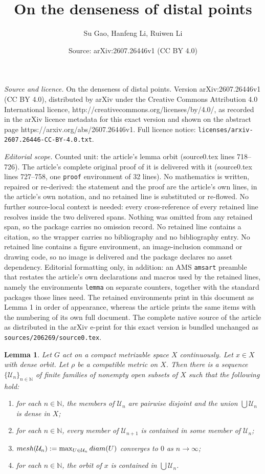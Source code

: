 \documentclass[10pt,a4paper]{amsart}
\title{On the denseness of distal points}
\author{Su Gao, Hanfeng Li, Ruiwen Li}
\date{Source: arXiv:2607.26446v1 (CC BY 4.0)}
\newtheorem{lemma}{Lemma}
\newcommand{\Nb}{{\mathbb N}}
\newcommand{\cU}{{\mathcal U}}
\newcommand{\diam}{{\rm diam}}
\begin{document}
\maketitle

\noindent\emph{Source and licence.} On the denseness of distal points. Version arXiv:2607.26446v1 (CC BY 4.0), distributed by arXiv under the Creative Commons Attribution 4.0 International licence, http://creativecommons.org/licenses/by/4.0/, as recorded in the arXiv licence metadata for this exact version and shown on the abstract page https://arxiv.org/abs/2607.26446v1. Full licence notice: \texttt{licenses/arxiv-2607.26446-CC-BY-4.0.txt}.\par\smallskip

\noindent\textit{Editorial scope.} Counted unit: the article's lemma orbit (source0.tex lines 718--726). The article's complete original proof of it is delivered with it (source0.tex lines 727--758, one \texttt{proof} environment of 32 lines). No mathematics is written, repaired or re-derived: the statement and the proof are the article's own lines, in the article's own notation, and no retained line is substituted or re-flowed.  No further source-local context is needed: every cross-reference of every retained line resolves inside the two delivered spans.  Nothing was omitted from any retained span, so the package carries no omission record.  No retained line contains a citation, so the wrapper carries no bibliography and no bibliography entry.  No retained line contains a figure environment, an image-inclusion command or drawing code, so no image is delivered and the package declares no asset dependency.  Editorial formatting only, in addition: an AMS \texttt{amsart} preamble that restates the article's own declarations and macros used by the retained lines, namely the environments \texttt{lemma} on separate counters, together with the standard packages those lines need.  The retained environments print in this document as Lemma 1 in order of appearance, whereas the article prints the same items with the numbering of its own full document.  The complete native source of the article as distributed in the arXiv e-print for this exact version is bundled unchanged as \texttt{sources/206269/source0.tex}.
\begin{lemma} \label{L-avoid orbit}
Let $G$ act on a compact metrizable space $X$ continuously. Let $x\in X$ with dense orbit. Let $\rho$ be a compatible metric on $X$. Then there is a sequence $\{\cU_n\}_{n\in \Nb}$ of finite families of nonempty open subsets of $X$ such that the following hold:
\begin{enumerate}
\item[(a)] for each $n\in \Nb$, the members of $\cU_n$ are pairwise disjoint and the union $\bigcup \cU_n$ is dense in $X$;
\item[(b)] for each $n\in \Nb$, every member of $\cU_{n+1}$ is contained in some member of $\cU_n$;
\item[(c)] ${\rm mesh}(\cU_n):=\max_{U\in \cU_n}\diam(U)$ converges to $0$ as $n\to \infty$;
\item[(d)] for each $n\in \Nb$, the orbit of $x$ is contained in $\bigcup \cU_n$.
\end{enumerate}
\end{lemma}
\end{document}
